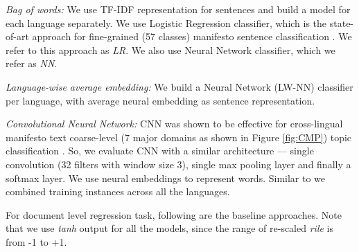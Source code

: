 \documentclass[11pt,a4paper]{article}
\begin{document}
\begin{description}
\item{\textit{Bag of words:}} We use TF-IDF representation for sentences and build a model for each language separately. We use Logistic Regression classifier, which is the state-of-art approach for fine-grained (57 classes) manifesto sentence classification \cite{biessmann2016automating}. We refer to this approach as \textit{LR}. We also use Neural Network classifier, which we refer as \textit{NN}.

\item{\textit{Language-wise average embedding:}} We build a Neural Network (LW-NN) classifier per language, with average neural embedding as sentence representation.

\item{\textit{Convolutional Neural Network:}} CNN was shown to be effective for cross-lingual manifesto text coarse-level (7 major domains as shown in Figure \ref{fig:CMP}) topic classification \cite{W17-2906}. So, we evaluate CNN with a similar architecture --- single convolution (32 filters with window size 3), single max pooling layer and finally a softmax layer. We use neural embeddings to represent words. Similar to \cite{W17-2906} we combined training instances across all the languages.
\end{description}

For document level regression task, following are the baseline approaches. Note that we use \textit{tanh} output for all the models, since the range of re-scaled \textit{rile} is from -1 to +1.
\end{document}
